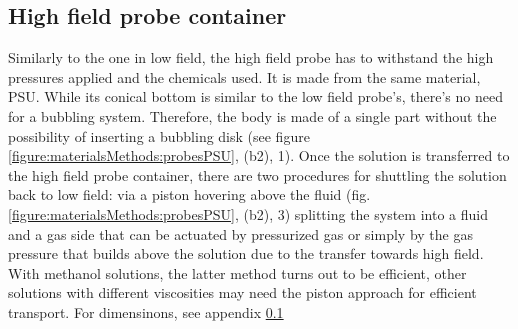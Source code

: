         \subsection{High field probe container}
        Similarly to the one in low field, the high field probe has to withstand the high pressures applied and the chemicals used. It is made from the same material, PSU.  While its conical bottom is similar to the low field probe's, there's no need for a bubbling system.  Therefore, the body is made of a single part without the possibility of inserting a bubbling disk (see figure \ref{figure:materialsMethods:probesPSU}, (b2), 1).  Once the solution is transferred to the high field probe container, there are two procedures for shuttling the solution back to low field: via a piston hovering above the fluid (fig. \ref{figure:materialsMethods:probesPSU}, (b2), 3) splitting the system into a fluid and a gas side that can be actuated by pressurized gas or simply by the gas pressure that builds above the solution due to the transfer towards high field.  With methanol solutions, the latter method turns out to be efficient, other solutions with different viscosities may need the piston approach for efficient transport.
        For dimensinons, see appendix \ref{}

